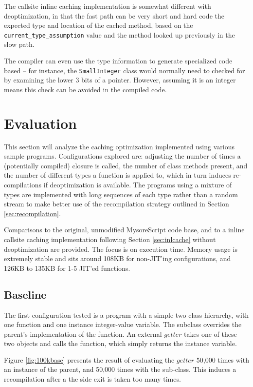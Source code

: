 \documentclass[journal,comsoc]{IEEEtran}
\begin{document}
		The callsite inline caching implementation is somewhat different with deoptimization, in that the fast path can be very short and hard code the expected type and location of the cached method, based on the \lstinline|current_type_assumption| value and the method looked up previously in the slow path.
		
		The compiler can even use the type information to generate specialized code based -- for instance, the \lstinline|SmallInteger| class would normally need to checked for by examining the lower 3 bits of a pointer. However, assuming it is an integer means this check can be avoided in the compiled code.

	
\section{Evaluation}
	
	This section will analyze the caching optimization implemented using various sample programs. Configurations explored are: adjusting the number of times a (potentially compiled) closure is called, the number of class methods present, and the number of different types a function is applied to, which in turn induces re-compilations if deoptimization is available. The programs using a mixture of types are implemented with long sequences of each type rather than a random stream to make better use of the recompilation strategy outlined in Section \ref{sec:recompilation}. 
	
	Comparisons to the original, unmodified MysoreScript code base, and to a inline callsite caching implementation following Section \ref{sec:inlcache} without deoptimization are provided. The focus is on execution time. Memory usage is extremely stable and sits around 108KB for non-JIT'ing configurations, and 126KB to 135KB for 1-5 JIT'ed functions.

	\subsection{Baseline}
	The first configuration tested is a program with a simple two-class hierarchy, with one function and one instance integer-value variable. The subclass overrides the parent's implementation of the function. An external $getter$ takes one of these two objects and calls the function, which simply returns the instance variable.
	
	Figure \ref{fig:100kbase} presents the result of evaluating the $getter$ 50,000 times with an instance of the parent, and 50,000 times with the sub-class. This induces a recompilation after a the side exit is taken too many times.
	
\end{document}
